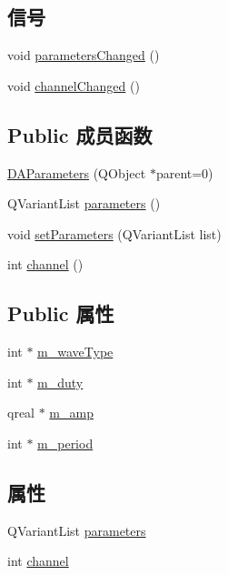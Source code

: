 \subsection*{信号}
\begin{DoxyCompactItemize}
\item 
void \hyperlink{class_d_a_parameters_a81b97b0fc990adc38d4b94f022dedebb}{parameters\+Changed} ()
\item 
void \hyperlink{class_d_a_parameters_aecf569fb041e4e40fd4ab6665231f8b3}{channel\+Changed} ()
\end{DoxyCompactItemize}
\subsection*{Public 成员函数}
\begin{DoxyCompactItemize}
\item 
\hyperlink{class_d_a_parameters_acf3334279485abe4ad9ec96e2b714008}{D\+A\+Parameters} (Q\+Object $\ast$parent=0)
\item 
Q\+Variant\+List \hyperlink{class_d_a_parameters_a6f4b3462528b0eab3f4963957f649c1e}{parameters} ()
\item 
void \hyperlink{class_d_a_parameters_a5ddb50f4c96574fba8c8663c8e0a7ee7}{set\+Parameters} (Q\+Variant\+List list)
\item 
int \hyperlink{class_d_a_parameters_a69289518ead00f524fac5b8858268329}{channel} ()
\end{DoxyCompactItemize}
\subsection*{Public 属性}
\begin{DoxyCompactItemize}
\item 
int $\ast$ \hyperlink{class_d_a_parameters_a1228cc62d04f29283fc6739e4c70f5c6}{m\+\_\+wave\+Type}
\item 
int $\ast$ \hyperlink{class_d_a_parameters_a5294b0f7d5f7799a754e8cc24bbefb80}{m\+\_\+duty}
\item 
qreal $\ast$ \hyperlink{class_d_a_parameters_a56457c861795a1480baac2c25b739fab}{m\+\_\+amp}
\item 
int $\ast$ \hyperlink{class_d_a_parameters_abd4e4a7223eb42cd090f6dc7a991e4b8}{m\+\_\+period}
\end{DoxyCompactItemize}
\subsection*{属性}
\begin{DoxyCompactItemize}
\item 
Q\+Variant\+List \hyperlink{class_d_a_parameters_ab418da6f029448485c336c1cacdfacc7}{parameters}
\item 
int \hyperlink{class_d_a_parameters_a3eeae539e46310db5bc8ace9709b740e}{channel}
\end{DoxyCompactItemize}


